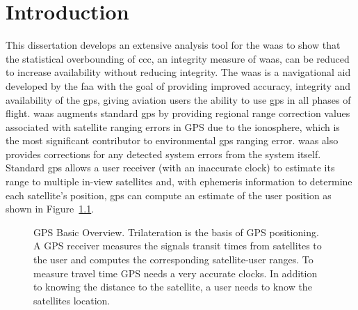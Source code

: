 \acresetall
\chapter{Introduction}
\label{chapter:introduction}

This dissertation develops an extensive analysis tool for the \ac{waas} to show that the statistical overbounding of \ac{ccc}, an integrity measure of \ac{waas}, can be reduced to increase availability without reducing integrity. The \ac{waas} is a navigational aid developed by the \ac{faa} with the goal of providing improved accuracy, integrity and availability of the \ac{gps}, giving aviation users the ability to use \ac{gps} in all phases of flight.  \ac{waas} augments standard \ac{gps} by providing regional range correction values associated with satellite ranging errors in GPS due to the ionosphere, which is the most significant contributor to environmental \ac{gps} ranging error.  \ac{waas} also provides corrections for any detected system errors from the system itself.  Standard \ac{gps} allows a user receiver (with an inaccurate clock) to estimate its range to multiple in-view satellites and, with ephemeris information to determine each satellite's position, \ac{gps} can compute an estimate of the user position as shown in Figure~\ref{fig:GPS-Basic-Overview}.

\begin{figure}
	\centering
	\caption{GPS Basic Overview. Trilateration is the basis of GPS positioning. A GPS receiver measures the signals transit times from satellites to the user and computes the corresponding satellite-user ranges. To measure travel time GPS needs a very accurate clocks. In addition to knowing the distance to the satellite, a user needs to know the satellites location.
  }
	\label{fig:GPS-Basic-Overview}
\end{figure}

